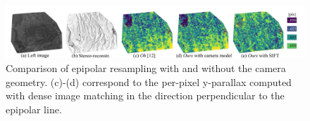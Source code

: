 \documentclass{ipol}
\begin{document}
\begin{figure}%
\centering
\includegraphics[width=\textwidth]{FIGS/chilli_epi_px1_px2_cmp.jpg}\caption{Comparison of epipolar resampling with and without the camera geometry. (c)-(d) correspond to the per-pixel y-parallax computed with dense image matching in the direction perpendicular to the epipolar line.}\label{fig:modelNomodelCmp}
\end{figure}

 

\end{document}
